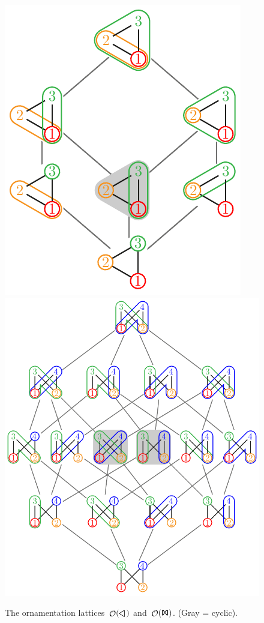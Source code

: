 \documentclass{amsart}
\theoremstyle{definition}
\renewcommand{\c}[1]{\mathcal{#1}} %
\DeclareMathOperator{\Orn}{\c{O}}  %
\newcommand{\Tgraph}{\sf I\!X\!I} %
\newcommand{\Kgraph}{\rotatebox[origin=c]{90}{$\boldsymbol{\triangle}$}} %
\begin{document}
\begin{figure}
	\centerline{\includegraphics[scale=.68,valign=c]{ornamentationsK}\qquad\includegraphics[scale=.68,valign=c]{ornamentationsT}}
	\caption{The ornamentation lattices~$\Orn(\Kgraph)$ and~$\Orn(\Tgraph)$. (Gray = cyclic).}
	\label{fig:ornamentationsKT} 
\end{figure}
\end{document}

